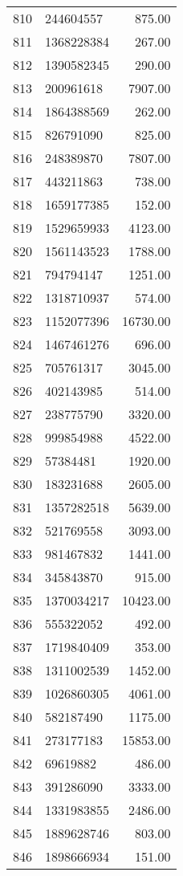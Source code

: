 \begin{table}[ht]
\begin{tabular}{rlr}
  810 & 244604557 & 875.00 \\ 
  811 & 1368228384 & 267.00 \\ 
  812 & 1390582345 & 290.00 \\ 
  813 & 200961618 & 7907.00 \\ 
  814 & 1864388569 & 262.00 \\ 
  815 & 826791090 & 825.00 \\ 
  816 & 248389870 & 7807.00 \\ 
  817 & 443211863 & 738.00 \\ 
  818 & 1659177385 & 152.00 \\ 
  819 & 1529659933 & 4123.00 \\ 
  820 & 1561143523 & 1788.00 \\ 
  821 & 794794147 & 1251.00 \\ 
  822 & 1318710937 & 574.00 \\ 
  823 & 1152077396 & 16730.00 \\ 
  824 & 1467461276 & 696.00 \\ 
  825 & 705761317 & 3045.00 \\ 
  826 & 402143985 & 514.00 \\ 
  827 & 238775790 & 3320.00 \\ 
  828 & 999854988 & 4522.00 \\ 
  829 & 57384481 & 1920.00 \\ 
  830 & 183231688 & 2605.00 \\ 
  831 & 1357282518 & 5639.00 \\ 
  832 & 521769558 & 3093.00 \\ 
  833 & 981467832 & 1441.00 \\ 
  834 & 345843870 & 915.00 \\ 
  835 & 1370034217 & 10423.00 \\ 
  836 & 555322052 & 492.00 \\ 
  837 & 1719840409 & 353.00 \\ 
  838 & 1311002539 & 1452.00 \\ 
  839 & 1026860305 & 4061.00 \\ 
  840 & 582187490 & 1175.00 \\ 
  841 & 273177183 & 15853.00 \\ 
  842 & 69619882 & 486.00 \\ 
  843 & 391286090 & 3333.00 \\ 
  844 & 1331983855 & 2486.00 \\ 
  845 & 1889628746 & 803.00 \\ 
  846 & 1898666934 & 151.00 \\ 

\end{tabular}
\end{table}
